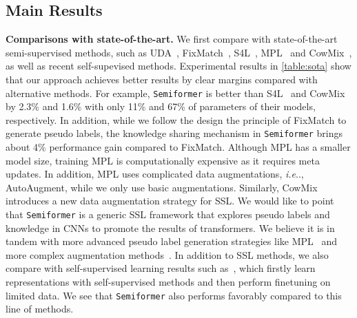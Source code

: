 \documentclass[runningheads]{llncs}
\makeatletter
\DeclareRobustCommand\onedot{\futurelet\@let@token\@onedot}
\def\@onedot{\ifx\@let@token.\else.\null\fi\xspace}
\def\ie{\emph{i.e}\onedot} \def\Ie{\emph{I.e}\onedot}
\newcommand{\fakeparagraph}[1]{\textbf{#1}}
\newcommand*{\system}{\texttt{Semiformer}\@\xspace}
\makeatother
\begin{document}
\subsection{Main Results}

\fakeparagraph{Comparisons with state-of-the-art.} We first compare with state-of-the-art semi-supervised methods, such as UDA~\cite{xie2020unsupervised}, FixMatch~\cite{sohn2020fixmatch}, S4L~\cite{zhai2019s4l}, MPL~\cite{pham2021meta} and CowMix~\cite{french2020milking}, as well as recent self-supevised methods. Experimental results in \cref{table:sota} show that our approach achieves better results by clear margins compared with alternative methods. For example, \system is better than S4L~\cite{zhai2019s4l} and CowMix~\cite{french2020milking} by 2.3\% and 1.6\% with only 11\% and 67\% of parameters of their models, respectively. In addition, while we follow the design the principle of FixMatch to generate pseudo labels, the knowledge sharing mechanism in \system brings about 4\% performance gain compared to FixMatch.  Although MPL has a smaller model size, training MPL is computationally expensive as it requires meta updates. In addition, MPL uses complicated data augmentations, \ie, AutoAugment, while we only use basic augmentations. Similarly, CowMix~\cite{french2020milking} introduces a new data augmentation strategy for SSL. We would like to point that \system is a generic SSL framework that explores pseudo labels and knowledge in CNNs to promote the results of transformers.  We believe it is in tandem with more advanced pseudo label generation strategies like MPL~\cite{pham2021meta} and more complex augmentation methods~\cite{french2020milking}. In addition to SSL methods, we also compare with self-supervised learning results such as~\cite{henaff2020data,chen2020big,grill2020bootstrap}, which firstly learn representations with self-supervised methods and then perform finetuning on limited data. We see that \system also performs favorably compared to this line of methods.
\end{document}
